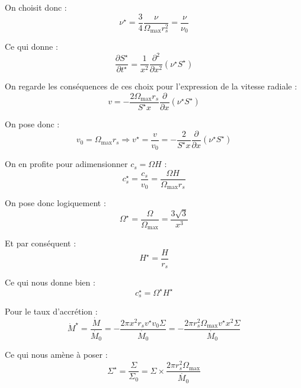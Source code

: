 On choisit donc :
\begin{equation}
    \nu^\star = \frac{3}{4} \frac{\nu}{\Omega_\mathrm{max} r_s^2} = \frac{\nu}{\nu_0}
\end{equation}

Ce qui donne :
\begin{equation}
    \frac{\partial S^\star}{\partial t^\star} = \frac{1}{x^2} \frac{\partial^2}{\partial x^2} \left(\nu^\star S^\star\right)
\end{equation}

On regarde les conséquences de ces choix pour l’expression de la vitesse radiale :
\begin{equation}
    v = - \frac{2 \Omega_\mathrm{max} r_s}{S^\star x} \frac{\partial}{\partial x} \left(\nu^\star S^\star\right)
\end{equation}

On pose donc :
\begin{equation}
    v_0 = \Omega_\mathrm{max} r_s \Rightarrow v^\star = \frac{v}{v_0} = - \frac{2}{S^\star x} \frac{\partial}{\partial x} \left(\nu^\star S^\star\right)
\end{equation}

On en profite pour adimensionner $c_s = \Omega H$ :
\begin{equation}
    c_s^\star = \frac{c_s}{v_0} = \frac{\Omega H}{\Omega_\mathrm{max} r_s}
\end{equation}

On pose donc logiquement :
\begin{equation}
    \Omega^\star = \frac{\Omega}{\Omega_\mathrm{max}} = \frac{3\sqrt{3}}{x^3}
\end{equation}

Et par conséquent :
\begin{equation}
    H^\star = \frac{H}{r_s}
\end{equation}

Ce qui nous donne bien :
\begin{equation}
    c_s^\star = \Omega^\star H^\star
\end{equation}

Pour le taux d’accrétion :
\begin{equation}
    \dot{M}^\star = \frac{\dot{M}}{\dot{M_0}} = - \frac{2 \pi x^2 r_s v^\star v_0 \Sigma}{\dot{M_0}} = - \frac{2 \pi r_s^2 \Omega_\mathrm{max} v^\star x^2 \Sigma}{\dot{M_0}} 
\end{equation}

Ce qui nous amène à poser :
\begin{equation}
    \Sigma^\star = \frac{\Sigma}{\Sigma_0} = \Sigma × \frac{2 \pi r_s^2 \Omega_\mathrm{max}}{\dot{M_0}}
\end{equation}


